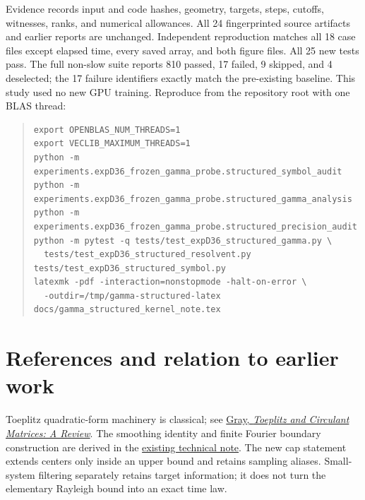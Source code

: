 \documentclass[11pt]{article}
\theoremstyle{definition}
\newcommand{\repo}{https://github.com/samlayton99/precision-mlps/blob/experiment/frozen-gamma-probe}
\begin{document}
Evidence records input and code hashes, geometry, targets, steps, cutoffs,
witnesses, ranks, and numerical allowances. All 24 fingerprinted source
artifacts and earlier reports are unchanged. Independent reproduction
matches all 18 case files except elapsed time, every saved array, and both
figure files. All 25 new tests pass. The full non-slow suite reports
810 passed, 17 failed, 9 skipped, and 4 deselected; the 17 failure
identifiers exactly match the pre-existing baseline. This study used no
new GPU training. Reproduce from the repository root with one BLAS thread:
\begin{quote}\footnotesize
\begin{verbatim}
export OPENBLAS_NUM_THREADS=1
export VECLIB_MAXIMUM_THREADS=1
python -m experiments.expD36_frozen_gamma_probe.structured_symbol_audit
python -m experiments.expD36_frozen_gamma_probe.structured_gamma_analysis
python -m experiments.expD36_frozen_gamma_probe.structured_precision_audit
python -m pytest -q tests/test_expD36_structured_gamma.py \
  tests/test_expD36_structured_resolvent.py tests/test_expD36_structured_symbol.py
latexmk -pdf -interaction=nonstopmode -halt-on-error \
  -outdir=/tmp/gamma-structured-latex docs/gamma_structured_kernel_note.tex
\end{verbatim}
\end{quote}

\section*{References and relation to earlier work}
Toeplitz quadratic-form machinery is classical; see
\href{https://ee.stanford.edu/~gray/CIT006-journal.pdf}{Gray,
\emph{Toeplitz and Circulant Matrices: A Review}}.
The smoothing identity and finite Fourier boundary construction are derived
in the \href{\repo/docs/gamma_uniform_grid_theorem.md}{existing technical note}.
The new cap statement extends centers only inside an upper bound and
retains sampling aliases. Small-system filtering separately retains target
information; it does not turn the elementary Rayleigh bound into an
exact time law.
\end{document}
